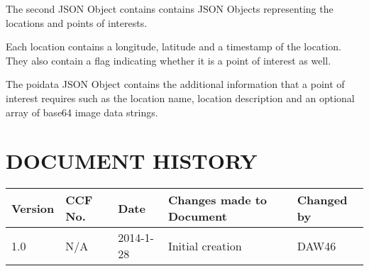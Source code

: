 \documentclass{project}
\begin{document}
The second JSON Object contains contains JSON Objects representing the locations and points of interests.

Each location contains a longitude, latitude and a timestamp of the location. They also contain a flag
indicating whether it is a point of interest as well.

The poidata JSON Object contains the additional information that a point of interest requires such as the location name,
location description and an optional array of base64 image data strings.





\clearpage


\section*{DOCUMENT HISTORY}
\begin{flushleft}
\begin{tabular}{ | p{1.5cm} | p{1cm} | p{2cm} | p{6cm}| p{1.5cm}| }
\hline
Version & CCF No. & Date & Changes made to Document & Changed by \\
\hline

1.0 & N/A & 2014-1-28 & Initial creation & DAW46 \\
\hline

\end{tabular}
\end{flushleft}
\label{thelastpage}
\end{document}
